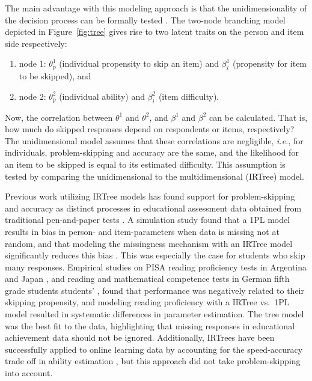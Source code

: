 \documentclass[12pt]{article}
\begin{document}
The main advantage with this modeling approach is that the unidimensionality of the decision process can be formally tested \parencite{de2012irtrees}. The two-node branching model depicted in Figure~\ref{fig:tree} gives rise to two latent traits on the person and item side respectively: 
\begin{enumerate}
    \item node 1: $\theta_p^1$ (individual propensity to skip an item) and $\beta_i^1$ (propensity for item to be skipped), and 
    \item node 2: $\theta_p^2$ (individual ability) and $\beta_i^2$ (item difficulty).
\end{enumerate}
Now, the correlation between $\theta^1$ and $\theta^2$, and $\beta^1$ and $\beta^2$ can be calculated. That is, how much do skipped responses depend on respondents or items, respectively? The unidimensional model assumes that these correlations are negligible, \textit{i.e.}, for individuals, problem-skipping and accuracy are the same, and the likelihood for an item to be skipped is equal to its estimated difficulty. This assumption is tested by comparing the unidimensional to the multidimensional (IRTree) model. 

Previous work utilizing IRTree models has found support for problem-skipping and accuracy as distinct processes in educational assessment data obtained from traditional pen-and-paper tests \parencite{okumura2014empirical, pohl2014dealing, debeer2017modeling, huang2020mixture, holman2005modelling}. A simulation study found that a 1PL model results in bias in person- and item-parameters when data is missing not at random, and that modeling the missingness mechanism with an IRTree model significantly reduces this bias \parencite{debeer2017modeling}. This was especially the case for students who skip many responses. Empirical studies on PISA reading proficiency tests in Argentina \parencite{debeer2017modeling} and Japan \parencite{okumura2014empirical}, and reading and mathematical competence tests in German fifth grade students students' \parencite{pohl2014dealing}, found that performance was negatively related to their skipping propensity, and modeling reading proficiency with a IRTree vs.\ 1PL model resulted in systematic differences in parameter estimation. The tree model was the best fit to the data, highlighting that missing responses in educational achievement data should not be ignored. Additionally, IRTrees have been successfully applied to online learning data by accounting for the speed-accuracy trade off in ability estimation \parencite{coomans2016distinguishing, hofman2018fast}, but this approach did not take problem-skipping into account. 
\end{document}
